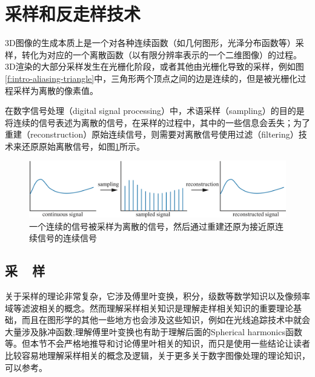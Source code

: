\section{采样和反走样技术}\label{sec:intro-sampling}
3D图像的生成本质上是一个对各种连续函数（如几何图形，光泽分布函数等）采样，转化为对应的一个离散函数（以有限分辨率表示的一个二维图像）的过程。3D渲染的大部分采样发生在光栅化阶段，或者其他由光栅化导致的采样，例如图\ref{f:intro-aliasing-triangle}中，三角形两个顶点之间的边是连续的，但是被光栅化过程采样为离散的像素值。

在数字信号处理（digital signal processing）中，术语采样（sampling）的目的是将连续的信号表述为离散的信号，在采样的过程中，其中的一些信息会丢失；为了重建（reconstruction）原始连续信号，则需要对离散信号使用过滤（filtering）技术来还原原始离散信号，如图\ref{f:intro-signal-processing}所示。

\begin{figure}
\begin{fullwidth}
	\includegraphics[width=1.\thewidth]{figures/intro/signal-processing}
	\caption{一个连续的信号被采样为离散的信号，然后通过重建还原为接近原连续信号的连续信号}
\label{f:intro-signal-processing}
\end{fullwidth}
\end{figure}


\subsection{采~~样}\label{sec:intro-sampling}
关于采样的理论非常复杂，它涉及傅里叶变换，积分，级数等数学知识以及像频率域等滤波相关的概念。然而理解采样相关知识是理解走样相关知识的重要理论基础，而且在图形学的其他一些地方也会涉及这些知识，例如在光线追踪技术中就会大量涉及脉冲函数;理解傅里叶变换也有助于理解后面的Spherical harmonics函数等。但本节不会严格地推导和讨论傅里叶相关的知识，而只是使用一些结论让读者比较容易地理解采样相关的概念及逻辑，关于更多关于数字图像处理的理论知识，可以参考\cite{b:DigitalImageProcessing}。



